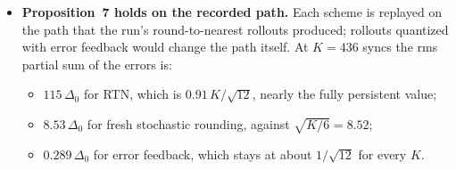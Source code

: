 \documentclass[11pt]{article}
\begin{document}
\begin{itemize}
\begin{itemize}
  \item After 435 steps the rounding error still correlates 0.691 with its start (prediction 0.692).
  \item The grid is nearly fixed, as the proposition assumes. At sync~436 no linear weight is more than $4.8\times10^{-4}$ from its start, so no row's absmax moved by more either. That is 0.7\% of the median row's absmax, and at most 1.3\% for 99\% of rows.
  \end{itemize}
\item \textbf{Proposition~7 holds on the recorded path.} Each scheme is replayed on the path that the run's round-to-nearest rollouts produced; rollouts quantized with error feedback would change the path itself. At $K=436$ syncs the rms partial sum of the errors is:
  \begin{itemize}
  \item $115\,\Delta_0$ for RTN, which is $0.91\,K/\sqrt{12}$, nearly the fully persistent value;
  \item $8.53\,\Delta_0$ for fresh stochastic rounding, against $\sqrt{K/6}=8.52$;
  \item $0.289\,\Delta_0$ for error feedback, which stays at about $1/\sqrt{12}$ for every $K$.
  \end{itemize}
\end{itemize}
\end{document}
